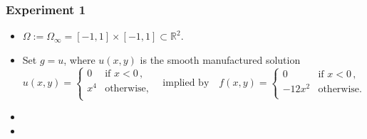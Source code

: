 \documentclass[aspectratio=169,xcolor=dvipsnames,11pt]{beamer}
\begin{document}
\begin{frame}\frametitle{Experiment 1}
\begin{itemize}
\item $\Omega := \Omega_{\infty} = [-1,1]\times[-1,1] \subset \mathbb R^2$.
\item Set $g=u$, where $u(x,y)$ is the smooth manufactured solution
\begin{equation}
\label{eq:Biactivity_SmoothManufacturedSolution}
	u(x,y)
	=
	\begin{cases}
		0 & \text{if~} x < 0\,,\\
		x^4 & \text{otherwise,}\\
	\end{cases}
	\quad
	\text{implied by}
	\quad
	f(x,y)
	=
	\begin{cases}
		0 & \text{if~} x < 0\,,\\
		-12x^2 & \text{otherwise.}\\
	\end{cases}
\end{equation}
\item {}
\item {} 
\end{itemize}
\end{frame}
\end{document}
